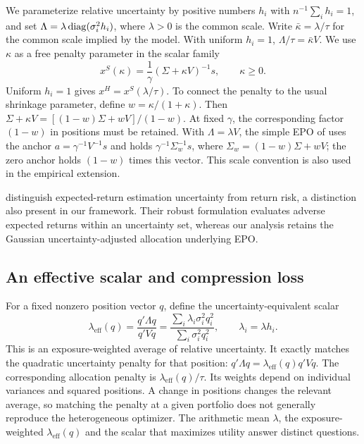 We parameterize relative uncertainty by positive numbers $h_i$ with $n^{-1}\sum_i h_i=1$, and set $\Lambda=\lambda\operatorname{diag}(\sigma_i^2h_i)$, where $\lambda>0$ is the common scale. Write $\bar\kappa=\lambda/\tau$ for the common scale implied by the model. With uniform $h_i=1$, $\Lambda/\tau=\bar\kappa V$. We use $\kappa$ as a free penalty parameter in the scalar family
\begin{equation}
x^S(\kappa)=\frac{1}{\gamma}(\Sigma+\kappa V)^{-1}s,
\qquad \kappa\geq0.
\label{eq:scalar}
\end{equation}
Uniform $h_i=1$ gives $x^H=x^S(\lambda/\tau)$. To connect the penalty to the usual shrinkage parameter, define $w=\kappa/(1+\kappa)$. Then $\Sigma+\kappa V=[(1-w)\Sigma+wV]/(1-w)$. At fixed $\gamma$, the corresponding factor $(1-w)$ in positions must be retained. With $\Lambda=\lambda V$, the simple EPO of \citet{pedersen2021} uses the anchor $a=\gamma^{-1}V^{-1}s$ and holds $\gamma^{-1}\Sigma_w^{-1}s$, where $\Sigma_w=(1-w)\Sigma+wV$; the zero anchor holds $(1-w)$ times this vector. This scale convention is also used in the empirical extension.

\citet{ceria2006} distinguish expected-return estimation uncertainty from return risk, a distinction also present in our framework. Their robust formulation evaluates adverse expected returns within an uncertainty set, whereas our analysis retains the Gaussian uncertainty-adjusted allocation underlying EPO.

\subsection{An effective scalar and compression loss}
For a fixed nonzero position vector $q$, define the uncertainty-equivalent scalar
\begin{equation}
\lambda_{\mathrm{eff}}(q)=\frac{q'\Lambda q}{q'Vq}
=\frac{\sum_i\lambda_i\sigma_i^2q_i^2}{\sum_i\sigma_i^2q_i^2},
\qquad \lambda_i=\lambda h_i.
\label{eq:effective-scalar}
\end{equation}
This is an exposure-weighted average of relative uncertainty. It exactly matches the quadratic uncertainty penalty for that position: $q'\Lambda q=\lambda_{\mathrm{eff}}(q)q'Vq$. The corresponding allocation penalty is $\lambda_{\mathrm{eff}}(q)/\tau$. Its weights depend on individual variances and squared positions. A change in positions changes the relevant average, so matching the penalty at a given portfolio does not generally reproduce the heterogeneous optimizer. The arithmetic mean $\lambda$, the exposure-weighted $\lambda_{\mathrm{eff}}(q)$ and the scalar that maximizes utility answer distinct questions.

